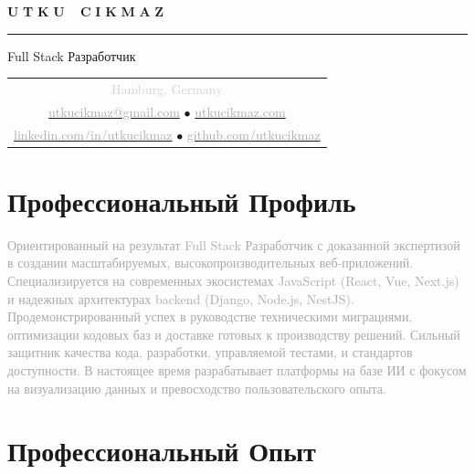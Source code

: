 \documentclass[10pt,a4paper]{article}
\newcommand{\gradientname}[1]{%
  \textcolor{darkgray!90}{\Huge\bfseries U}%
  \textcolor{darkgray!80}{\Huge\bfseries T}%
  \textcolor{darkgray!70}{\Huge\bfseries K}%
  \textcolor{darkgray!60}{\Huge\bfseries U}%
  \textcolor{mediumgray!90}{\Huge\bfseries\ }%
  \textcolor{mediumgray!80}{\Huge\bfseries C}%
  \textcolor{mediumgray!70}{\Huge\bfseries I}%
  \textcolor{mediumgray!60}{\Huge\bfseries K}%
  \textcolor{mediumgray!50}{\Huge\bfseries M}%
  \textcolor{lightgray!80}{\Huge\bfseries A}%
  \textcolor{lightgray!70}{\Huge\bfseries Z}%
}
\begin{document}
\color{black}
\pagestyle{empty}

\begin{center}
  \vspace{-3pt}
  \gradientname{UTKU CIKMAZ}
  
  \vspace{4pt}
  \textcolor{verylightgray}{\rule{0.35\textwidth}{0.6pt}}
  
  \vspace{4pt}
  {\large\color{mediumgray}Full Stack Разработчик}
  
  \vspace{5pt}
  \begin{tabular}{c}
    \textcolor{lightgray}{\small Hamburg, Germany} \\[2pt]
    \href{mailto:utkucikmaz@gmail.com}{\textcolor{darkgray}{utkucikmaz@gmail.com}} \quad
    \textcolor{verylightgray}{$\bullet$} \quad
    \href{https://www.utkucikmaz.com}{\textcolor{darkgray}{utkucikmaz.com}} \\[1pt]
    \href{https://linkedin.com/in/utkucikmaz}{\textcolor{darkgray}{linkedin.com/in/utkucikmaz}} \quad
    \textcolor{verylightgray}{$\bullet$} \quad
    \href{https://github.com/utkucikmaz}{\textcolor{darkgray}{github.com/utkucikmaz}}
  \end{tabular}
\end{center}

\vspace{1pt}

\section*{Профессиональный Профиль}
\vspace{0pt}
\textcolor{darkgray}{%
Ориентированный на результат Full Stack Разработчик с доказанной экспертизой в создании масштабируемых, высокопроизводительных веб-приложений. Специализируется на современных экосистемах JavaScript (React, Vue, Next.js) и надежных архитектурах backend (Django, Node.js, NestJS). Продемонстрированный успех в руководстве техническими миграциями, оптимизации кодовых баз и доставке готовых к производству решений. Сильный защитник качества кода, разработки, управляемой тестами, и стандартов доступности. В настоящее время разрабатывает платформы на базе ИИ с фокусом на визуализацию данных и превосходство пользовательского опыта.
}
\vspace{1pt}

\section*{Профессиональный Опыт}
\end{document}
